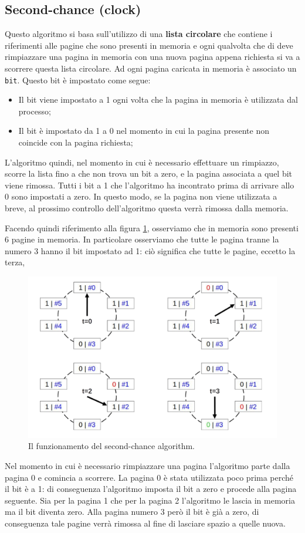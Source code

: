 \subsection{Second-chance (clock)}\label{second chance}
Questo algoritmo si basa sull'utilizzo di una \textbf{lista circolare} che contiene i riferimenti alle pagine che sono presenti in memoria e ogni qualvolta che di deve rimpiazzare una pagina in memoria con una nuova pagina appena richiesta si va a scorrere questa lista circolare. Ad ogni pagina caricata in memoria è associato un \texttt{bit}. Questo bit è impostato come segue:
\vspace{-4px}
\begin{itemize}
\setlength{\itemsep}{-1px}
    \item Il bit viene impostato a 1 ogni volta che la pagina in memoria è utilizzata dal processo;
    \item Il bit è impostato da 1 a 0 nel momento in cui la pagina presente non coincide con la pagina richiesta;
\end{itemize}
L'algoritmo quindi, nel momento in cui è necessario effettuare un rimpiazzo, scorre la lista fino a che non trova un bit a zero, e la pagina associata a quel bit viene rimossa. Tutti i bit a 1 che l'algoritmo ha incontrato prima di arrivare allo 0 sono impostati a zero. In questo modo, se la pagina non viene utilizzata a breve, al prossimo controllo dell'algoritmo questa verrà rimossa dalla memoria.

Facendo quindi riferimento alla figura \ref{fig:second_chance}, osserviamo che in memoria sono presenti 6 pagine in memoria. In particolare osserviamo che tutte le pagina tranne la numero 3 hanno il bit impostato ad 1: ciò significa che tutte le pagine, eccetto la terza, 
\begin{figure}[h]
    \centering
    \includegraphics[width = .6\textwidth]{../res/imgs/virtual memory/second_chance.png}
    \caption{Il funzionamento del second-chance algorithm.}
    \label{fig:second_chance}
\end{figure}
Nel momento in cui è necessario rimpiazzare una pagina l'algoritmo parte dalla pagina 0 e comincia a scorrere. La pagina 0 è stata utilizzata poco prima perché il bit è a 1: di conseguenza l'algoritmo imposta il bit a zero e procede alla pagina seguente. Sia per la pagina 1 che per la pagina 2 l'algoritmo le lascia in memoria ma il bit diventa zero. Alla pagina numero 3 però il bit è già a zero, di conseguenza tale pagine verrà rimossa al fine di lasciare spazio a quelle nuova. 

